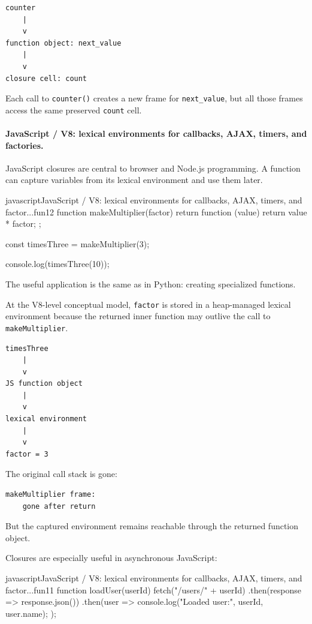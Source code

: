 \begin{verbatim}
counter
    |
    v
function object: next_value
    |
    v
closure cell: count
\end{verbatim}

Each call to \texttt{counter()} creates a new frame for \texttt{next\_value}, but all those frames access the same preserved \texttt{count} cell.

\paragraph{JavaScript / V8: lexical environments for callbacks, AJAX, timers, and factories.}

JavaScript closures are central to browser and Node.js programming. A function can capture variables from its lexical environment and use them later.

\begin{codebox}[]{javascript}{JavaScript / V8: lexical environments for callbacks, AJAX, timers, and factor...}{fun12}
function makeMultiplier(factor) {
    return function (value) {
        return value * factor;
    };
}

const timesThree = makeMultiplier(3);

console.log(timesThree(10));
\end{codebox}


The useful application is the same as in Python: creating specialized functions.

At the V8-level conceptual model, \texttt{factor} is stored in a heap-managed lexical environment because the returned inner function may outlive the call to \texttt{makeMultiplier}.

\begin{verbatim}
timesThree
    |
    v
JS function object
    |
    v
lexical environment
    |
    v
factor = 3
\end{verbatim}

The original call stack is gone:

\begin{verbatim}
makeMultiplier frame:
    gone after return
\end{verbatim}

But the captured environment remains reachable through the returned function object.

Closures are especially useful in asynchronous JavaScript:

\begin{codebox}[]{javascript}{JavaScript / V8: lexical environments for callbacks, AJAX, timers, and factor...}{fun11}
function loadUser(userId) {
    fetch("/users/" + userId)
        .then(response => response.json())
        .then(user => {
            console.log("Loaded user:", userId, user.name);
        });
}
\end{codebox}


